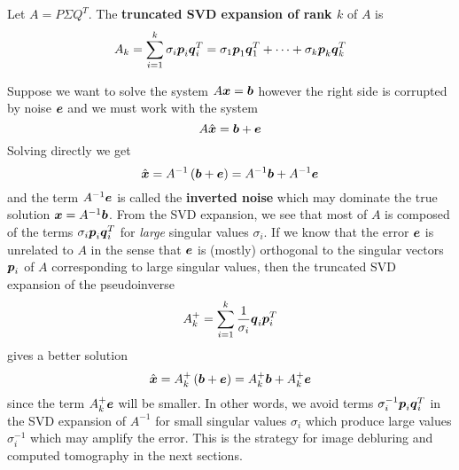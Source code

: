 \begin{definition}
Let $A = P \Sigma Q^T$. The {\bf truncated SVD expansion of rank $k$} of $A$ is
$$
A_k = \sum_{i=1}^k \sigma_i \boldsymbol{p}_i \boldsymbol{q}_i^T = \sigma_1 \boldsymbol{p}_1 \boldsymbol{q}_1^T + \cdots + \sigma_k \boldsymbol{p}_k \boldsymbol{q}_k^T
$$
\end{definition}

\begin{note}
Suppose we want to solve the system $A \boldsymbol{x} = \boldsymbol{b}$ however the right side is corrupted by noise $\boldsymbol{e}$ and we must work with the system
$$
A \hat{\boldsymbol{x}} = \boldsymbol{b} + \boldsymbol{e}
$$
Solving directly we get
$$
\hat{\boldsymbol{x}} =  A^{-1} \left( \boldsymbol{b} + \boldsymbol{e} \right)= A^{-1}\boldsymbol{b} + A^{-1}\boldsymbol{e}
$$
and the term $A^{-1}\boldsymbol{e}$ is called the {\bf inverted noise} which may dominate the true solution $\boldsymbol{x} = A^{-1} \boldsymbol{b}$. From the SVD expansion, we see that most of $A$ is composed of the terms $\sigma_i  \boldsymbol{p}_i \boldsymbol{q}_i^T$ for {\it large} singular values $\sigma_i$. If we know that the error $\boldsymbol{e}$ is unrelated to $A$ in the sense that $\boldsymbol{e}$ is (mostly) orthogonal to the singular vectors $\boldsymbol{p}_i$ of $A$ corresponding to large singular values, then the truncated SVD expansion of the pseudoinverse
$$
A_k^+ = \sum_{i=1}^k \frac{1}{\sigma_i} \boldsymbol{q}_i \boldsymbol{p}_i^T
$$
gives a better solution 
$$
\hat{\boldsymbol{x}} =  A^+_k \left( \boldsymbol{b} + \boldsymbol{e} \right)= A^+_k \boldsymbol{b} + A^+_k\boldsymbol{e}
$$
since the term $A^+_k\boldsymbol{e}$ will be smaller. In other words, we avoid terms $\sigma_i^{-1} \boldsymbol{p}_i \boldsymbol{q}_i^T$ in the SVD expansion of $A^{-1}$ for small singular values $\sigma_i$ which produce large values $\sigma_i^{-1}$ which may amplify the error. This is the strategy for image debluring and computed tomography in the next sections. 
\end{note}